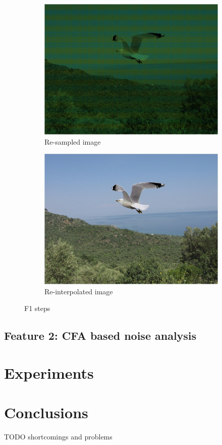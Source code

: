 \documentclass{template/acm_proc_article-sp}
\begin{document}
\begin{figure}
    \begin{subfigure}{0.23\textwidth}
        \centering
        \includegraphics[trim=0 0 0 0,clip,width=\linewidth]{report/results/f1_steps_2.jpg}
        \caption{Re-sampled image}
    \end{subfigure}
    \hspace*{\fill}
    \begin{subfigure}{0.23\textwidth}
        \centering
        \includegraphics[trim=0 0 0 0,clip,width=\linewidth]{report/results/f1_steps_3.jpg}
        \caption{Re-interpolated image}
    \end{subfigure}
    
    \caption{F1 steps}
    \label{img_f1_steps}
\end{figure}

\subsection{Feature 2: CFA based noise analysis}

\section{Experiments}

\section{Conclusions}
TODO
shortcomings and problems



\end{document}
